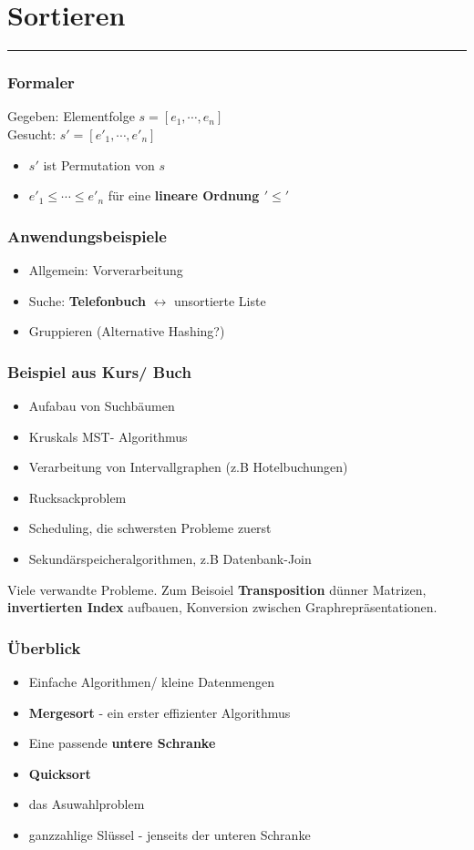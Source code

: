 \section{Sortieren}
\rule{\textwidth}{0.4pt}
\subsubsection*{Formaler} Gegeben: Elementfolge $s = [e_1, \cdots, e_n]$ \\ Gesucht: $s' = [e'_1, \cdots, e'_n]$
\begin{itemize}
    \item $s'$ ist Permutation von $s$
    \item $e'_1 \leq \cdots \leq e'_n$ für eine \textbf{lineare Ordnung $'\leq'$}
\end{itemize}
\subsubsection*{Anwendungsbeispiele}
\begin{itemize}
    \item Allgemein: Vorverarbeitung
    \item Suche: \textbf{Telefonbuch} $\leftrightarrow$ unsortierte Liste
    \item Gruppieren (Alternative Hashing?)
\end{itemize}

\subsubsection*{Beispiel aus Kurs/ Buch}
\begin{itemize}
    \item Aufabau von Suchbäumen 
    \item Kruskals MST- Algorithmus
    \item Verarbeitung von Intervallgraphen (z.B Hotelbuchungen)
    \item Rucksackproblem
    \item Scheduling, die schwersten Probleme zuerst
    \item Sekundärspeicheralgorithmen, z.B Datenbank-Join
\end{itemize}
Viele verwandte Probleme. Zum Beisoiel \textbf{Transposition} dünner Matrizen, \textbf{invertierten Index} aufbauen, Konversion zwischen Graphrepräsentationen.
\subsubsection*{Überblick}
\begin{itemize}
    \item Einfache Algorithmen/ kleine Datenmengen
    \item \textbf{Mergesort} - ein erster effizienter Algorithmus
    \item Eine passende \textbf{untere Schranke}
    \item \textbf{Quicksort}
    \item das Asuwahlproblem
    \item ganzzahlige Slüssel - jenseits der unteren Schranke
\end{itemize}

